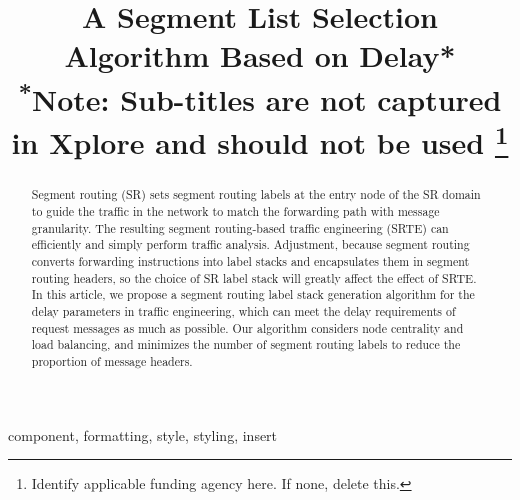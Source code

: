 \documentclass[conference]{IEEEtran}
\begin{document}
\title{A Segment List Selection Algorithm Based on Delay*\\
{\footnotesize \textsuperscript{*}Note: Sub-titles are not captured in Xplore and
should not be used}
\thanks{Identify applicable funding agency here. If none, delete this.}
}

\author{
\and
{}
\and
{}
}

\maketitle

\begin{abstract}
Segment routing (SR) sets segment routing labels at the entry node of the SR domain to guide the traffic in the network to match the forwarding path with message granularity. The resulting segment routing-based traffic engineering (SRTE) can efficiently and simply perform traffic analysis. Adjustment, because segment routing converts forwarding instructions into label stacks and encapsulates them in segment routing headers, so the choice of SR label stack will greatly affect the effect of SRTE. In this article, we propose a segment routing label stack generation algorithm for the delay parameters in traffic engineering, which can meet the delay requirements of request messages as much as possible. Our algorithm considers node centrality and load balancing, and minimizes the number of segment routing labels to reduce the proportion of message headers.
\end{abstract}

\begin{IEEEkeywords}
component, formatting, style, styling, insert
\end{IEEEkeywords}
\end{document}
